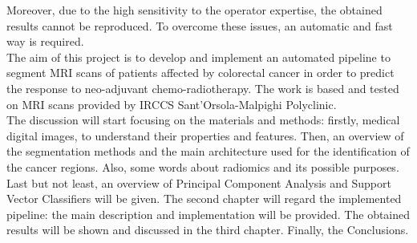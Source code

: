 \documentclass{standalone}
\begin{document}
Moreover, due to the high sensitivity to the operator expertise, the obtained results cannot be reproduced\cite{Trebeschi2017}.
To overcome these issues, an automatic and fast way is required.\\
The aim of this project is to develop and implement an automated pipeline to segment MRI scans of patients affected by colorectal cancer in order to predict the response to neo-adjuvant chemo-radiotherapy. 
The work is based and tested on MRI scans provided by IRCCS Sant’Orsola-Malpighi Polyclinic.\\
The discussion will start focusing on the materials and methods: firstly, medical digital images, to understand their properties and features.
Then, an overview of the segmentation methods and the main architecture used for the identification of the cancer regions.
Also, some words about radiomics and its possible purposes.
Last but not least, an overview of Principal Component Analysis and Support Vector Classifiers will be given.
The second chapter will regard the implemented pipeline: the main description and implementation will be provided.
The obtained results will be shown and discussed in the third chapter.
Finally, the Conclusions.
\end{document}
